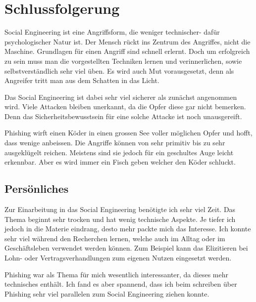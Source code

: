 \chapter{Schlussfolgerung}

Social Engineering ist eine Angriffsform, die weniger technischer- dafür psychologischer Natur ist. Der Mensch rückt ins Zentrum des Angriffes, nicht die Maschine. Grundlagen für einen Angriff sind schnell erlernt. Doch um erfolgreich zu sein muss man die vorgestellten Techniken lernen und verinnerlichen, sowie selbstverständlich sehr viel üben. Es wird auch Mut vorausgesetzt, denn als Angreifer tritt man aus dem Schatten in das Licht. 

Das Social Engineering ist dabei sehr viel sicherer als zunächst angenommen wird. Viele Attacken bleiben unerkannt, da die Opfer diese gar nicht bemerken. Denn das Sicherheitsbewusstsein für eine solche Attacke ist noch unausgereift.

Phishing wirft einen Köder in einen grossen See voller möglichen Opfer und hofft, dass wenige anbeissen. Die Angriffe können von sehr primitiv bis zu sehr ausgeklügelt reichen. Meistens sind sie jedoch für ein geschultes Auge leicht erkennbar. Aber es wird immer ein Fisch geben welcher den Köder schluckt.

\section{Persönliches}
Zur Einarbeitung in das Social Engineering benötigte ich sehr viel Zeit. Das Thema beginnt sehr trocken und hat wenig technische Aspekte. Je tiefer ich jedoch in die Materie eindrang, desto mehr packte mich das Interesse. Ich konnte sehr viel während den Recherchen lernen, welche auch im Alltag oder im Geschäftsleben verwendet werden können. Zum Beispiel kann das Elizitieren bei Lohn- oder Vertragsverhandlungen zum eigenen Nutzen eingesetzt werden.

Phishing war als Thema für mich wesentlich interessanter, da dieses mehr technisches enthält. Ich fand es aber spannend, dass ich beim schreiben über Phishing sehr viel parallelen zum Social Engineering ziehen konnte.

\glsaddall

